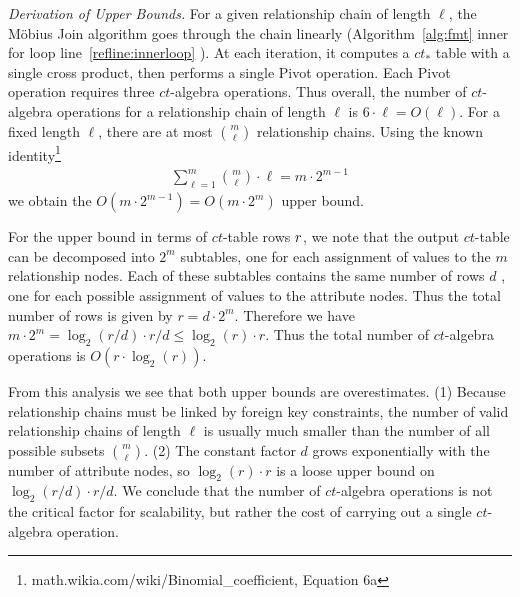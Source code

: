 \documentclass{acm_proc_article-sp}
\newcommand{\ct}{\mathit{ct}}
\begin{document}
\emph{Derivation of Upper Bounds.}
For a given relationship chain of length $\ell$,  the  M\"obius Join algorithm goes through the chain linearly (Algorithm~\ref{alg:fmt} 
inner for loop line~\ref{reﬂine:innerloop}%
). 
At each iteration, it computes a $\ct_{*}$ table with a single cross product, then performs a single Pivot operation.
 Each Pivot operation requires three  $\ct$-algebra operations. 
Thus overall, the number of  $\ct$-algebra operations for a relationship chain of length $\ell$ is $6 \cdot \ell = O(\ell)$. For a fixed length $\ell$, there are at most $\binom{m}{\ell}$ relationship chains. Using the known identity\footnote{math.wikia.com/wiki/Binomial\_coefficient, Equation 6a}
\begin{align} 
\sum_{\ell=1}^{m} {m\choose \ell} \cdot \ell = m \cdot  2^{m-1} \label{eq:upperbound}
\end{align}
we obtain the $O(m \cdot  2^{m-1}) = O(m \cdot  2^{m})$ upper bound.%

For the upper bound in terms of $\ct$-table rows $r$, we note that the output $\ct$-table can be decomposed into $2^{m}$ subtables, one for each assignment of values to the $m$ relationship nodes. 
Each of these subtables contains the same number of rows $d$ , one for each possible assignment of values to the attribute nodes. 
Thus the total number of rows is given by $r = d \cdot 2^m.$ 
Therefore we have 
$m \cdot 2^{m} = \log_{2} (r/d) \cdot r/d \leq \log_{2}(r) \cdot r.$
Thus the total number of $\ct$-algebra operations is $O(r \cdot \log_{2}(r))$.

From this analysis we see that both upper bounds are overestimates. (1) Because relationship chains must be linked by foreign key constraints, the number of valid relationship chains of length $\ell$ is usually much smaller than the number of all possible subsets ${m\choose \ell}$. (2) The constant factor $d$ grows exponentially with the number of attribute nodes, so $\log_{2}(r) \cdot r$ is a loose upper bound on $\log_{2} (r/d) \cdot r/d$. 
We conclude that the number of $\ct$-algebra operations is not the critical factor for scalability, but rather the cost of %
carrying out a single $\ct$-algebra operation. 
\end{document}
